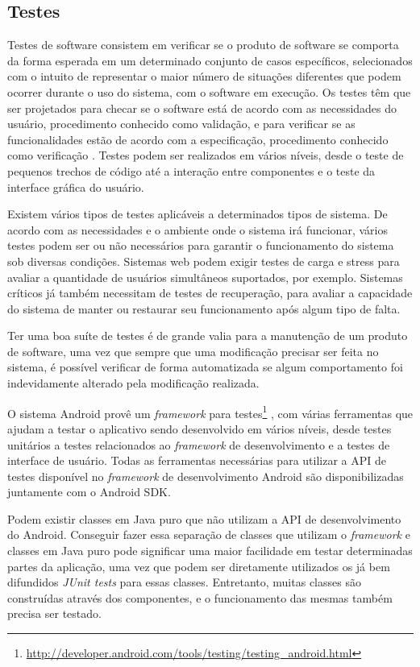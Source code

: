 \subsection{Testes}

Testes de software consistem em verificar se o produto de software se comporta da forma esperada em um determinado conjunto de casos específicos, selecionados com o intuito de representar o maior número de situações diferentes que podem ocorrer durante o uso do sistema, com o software em execução. Os testes têm que ser projetados para checar se o software está de acordo com as necessidades do usuário, procedimento conhecido como validação, e para verificar se as funcionalidades estão de acordo com a especificação, procedimento conhecido como verificação \cite{swebok}. Testes podem ser realizados em vários níveis, desde o teste de pequenos trechos de código até a interação entre componentes e o teste da interface gráfica do usuário.

Existem vários tipos de testes aplicáveis a determinados tipos de sistema. De acordo com as necessidades e o ambiente onde o sistema irá funcionar, vários testes podem ser ou não necessários para garantir o funcionamento do sistema sob diversas condições. Sistemas web podem exigir testes de carga e stress para avaliar a quantidade de usuários simultâneos suportados, por exemplo. Sistemas críticos já também necessitam de testes de recuperação, para avaliar a capacidade do sistema de manter ou restaurar seu funcionamento após algum tipo de falta.

Ter uma boa suíte de testes é de grande valia para a manutenção de um produto de software, uma vez que sempre que uma modificação precisar ser feita no sistema, é possível verificar de forma automatizada se algum comportamento foi indevidamente alterado pela modificação realizada.

O sistema Android provê um \textit{framework} para testes\footnote{\url{http://developer.android.com/tools/testing/testing\_android.html}} , com várias ferramentas que ajudam a testar o aplicativo sendo desenvolvido em vários níveis, desde testes unitários a testes relacionados ao \textit{framework} de desenvolvimento e a testes de interface de usuário. Todas as ferramentas necessárias para utilizar a API de testes disponível no \textit{framework} de desenvolvimento Android são disponibilizadas juntamente com o Android SDK.

Podem existir classes em Java puro que não utilizam a API de desenvolvimento do Android. Conseguir fazer essa separação de classes que utilizam o \textit{framework} e classes em Java puro pode significar uma maior facilidade em testar determinadas partes da aplicação, uma vez que podem ser diretamente utilizados os já bem difundidos \textit{JUnit tests} para essas classes. Entretanto, muitas classes são construídas através dos componentes, e o funcionamento das mesmas também precisa ser testado.


